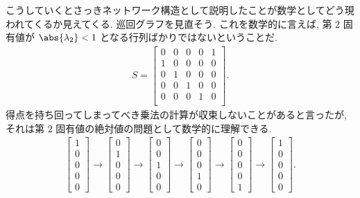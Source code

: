 \documentclass[openany, a4paper, oneside]{jsbook}
\begin{document}
こうしていくとさっきネットワーク構造として説明したことが数学としてどう現われてくるか見えてくる.
巡回グラフを見直そう.
これを数学的に言えば, 第 2 固有値が $\abs{\lambda_2} < 1$ となる行列ばかりではないということだ.
\begin{align}
 S
 =
 \begin{bmatrix}
  0    &    0    &    0    &    0    &    1\\
  1    &    0    &    0    &    0    &    0\\
  0    &    1    &    0    &    0    &    0\\
  0    &    0    &    1    &    0    &    0\\
  0    &    0    &    0    &    1    &    0\\
 \end{bmatrix}
 .
\end{align}
得点を持ち回ってしまってべき乗法の計算が収束しないことがあると言ったが,
それは第 2 固有値の絶対値の問題として数学的に理解できる.
\begin{align}
 \begin{bmatrix}
  1\\
  0\\
  0\\
  0\\
  0
 \end{bmatrix}
 \to
 \begin{bmatrix}
  0\\
  1\\
  0\\
  0\\
  0
 \end{bmatrix}
 \to
 \begin{bmatrix}
  0\\
  0\\
  1\\
  0\\
  0
 \end{bmatrix}
 \to
 \begin{bmatrix}
  0\\
  0\\
  0\\
  1\\
  0
 \end{bmatrix}
 \to
 \begin{bmatrix}
  0\\
  0\\
  0\\
  0\\
  1
 \end{bmatrix}
 \to
 \begin{bmatrix}
  1\\
  0\\
  0\\
  0\\
  0
 \end{bmatrix}
 .
\end{align}
\end{document}
